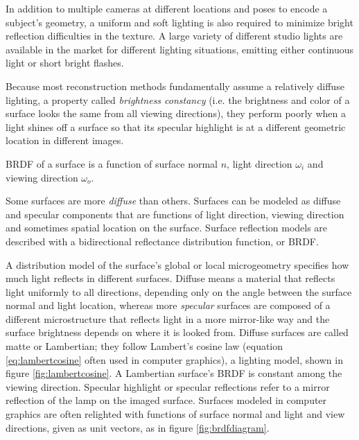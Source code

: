 In addition to multiple cameras at different locations and poses to encode a subject's geometry, a uniform and soft lighting is also required to minimize bright reflection difficulties in the texture.
A large variety of different studio lights are available in the market for different lighting situations, emitting either continuous light or short bright flashes.

Because most reconstruction methods fundamentally assume a relatively diffuse lighting, a property called \emph{brightness constancy} (i.e. the brightness and color of a surface looks the same from all viewing directions), they perform poorly when a light shines off a surface so that its specular highlight is at a different geometric location in different images.

{BRDF of a surface is a function of surface normal $n$, light direction $\omega_i$ and viewing direction $\omega_o$.}

Some surfaces are more \emph{diffuse} than others.
Surfaces can be modeled as diffuse and specular components that are functions of light direction, viewing direction and sometimes spatial location on the surface.
Surface reflection models are described with a bidirectional reflectance distribution function, or BRDF. \cite{nicodemus1965dirreflectanceetc}

A distribution model of the surface's global or local microgeometry specifies how much light reflects in different surfaces. \cite{nayar1991surface} %
Diffuse means a material that reflects light uniformly to all directions, depending only on the angle between the surface normal and light location, whereas more \emph{specular} surfaces are composed of a different microstructure that reflects light in a more mirror-like way and the surface brightness depends on where it is looked from.
Diffuse surfaces are called matte or Lambertian; they follow Lambert's cosine law (equation \ref{eq:lambertcosine} often used in computer graphics), a lighting model, shown in figure \ref{fig:lambertcosine}. \cite{lamberttodo}
A Lambertian surface's BRDF is constant among the viewing direction.
Specular highlight or specular reflections refer to a mirror reflection of the lamp on the imaged surface.
Surfaces modeled in computer graphics are often relighted with functions of surface normal and light and view directions, given as unit vectors, as in figure \ref{fig:brdfdiagram}.


